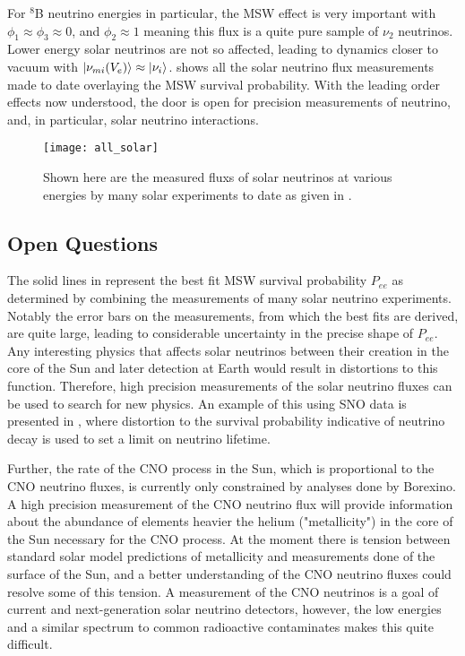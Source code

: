 For $^8$B neutrino energies in particular, the MSW effect is very important with $\phi_1 \approx \phi_3 \approx 0$, and $\phi_2 \approx 1$ meaning this flux is a quite pure sample of $\nu_2$ neutrinos. 
Lower energy solar neutrinos are not so affected, leading to dynamics closer to vacuum with $\ket{\nu_{mi}(V_e)} \approx \ket{\nu_i}$.
 shows all the solar neutrino flux measurements made to date overlaying the MSW survival probability.
With the leading order effects now understood, the door is open for precision measurements of neutrino, and, in particular, solar neutrino interactions.

\begin{figure}
\centering
\texttt{[image: all\_solar]}
\caption{\label{fig:global_solar}Shown here are the measured fluxs of solar neutrinos at various energies by many solar experiments to date as given in \cite{nonstandard_interactions}.}
\end{figure}

\subsection{Open Questions}
The solid lines in  represent the best fit MSW survival probability $P_{ee}$ as determined by combining the measurements of many solar neutrino experiments.
Notably the error bars on the measurements, from which the best fits are derived, are quite large, leading to considerable uncertainty in the precise shape of $P_{ee}$.
Any interesting physics that affects solar neutrinos between their creation in the core of the Sun and later detection at Earth would result in distortions to this function.
Therefore, high precision measurements of the solar neutrino fluxes can be used to search for new physics. 
An example of this using SNO data is presented in , where distortion to the survival probability indicative of neutrino decay is used to set a limit on neutrino lifetime.

Further, the rate of the CNO process in the Sun, which is proportional to the CNO neutrino fluxes, is currently only constrained by analyses done by Borexino.
A high precision measurement of the CNO neutrino flux will provide information about the abundance of elements heavier the helium ("metallicity") in the core of the Sun necessary for the CNO process.
At the moment there is tension between standard solar model predictions of metallicity and measurements done of the surface of the Sun, and a better understanding of the CNO neutrino fluxes could resolve some of this tension.
A measurement of the CNO neutrinos is a goal of current and next-generation solar neutrino detectors, however, the low energies and a similar spectrum to common radioactive contaminates makes this quite difficult.

